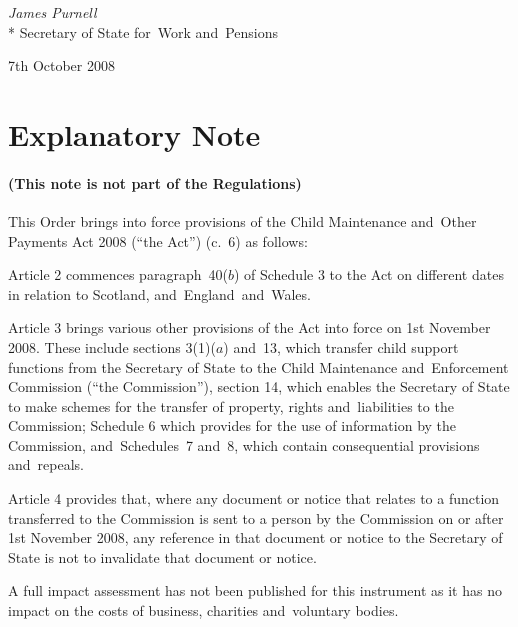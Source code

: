 \documentclass[12pt,a4paper]{article}
\begin{document}
{\raggedleft
\emph{James Purnell}\\*
Secretary
of State %
for~Work and~Pensions

}

7th October 2008

\small

\part{Explanatory Note}

\renewcommand\parthead{— Explanatory Note}

\subsection*{(This note is not part of the Regulations)}

This Order brings into force provisions of the Child Maintenance and~Other Payments Act 2008 (“the Act”) (c.~6) as follows:

Article 2 commences paragraph~40($b$)  of Schedule 3 to the Act on different dates in relation to Scotland, and~England~and~Wales.

Article 3 brings various other provisions of the Act into force on 1st November 2008. These include sections 3(1)($a$)  and~13, which transfer child support functions from the Secretary of State to the Child Maintenance and~Enforcement Commission (“the Commission”), section 14, which enables the Secretary of State to make schemes for the transfer of property, rights and~liabilities to the Commission; Schedule 6 which provides for the use of information by the Commission, and~Schedules~7 and~8, which contain consequential provisions and~repeals.

Article 4 provides that, where any document or notice that relates to a function transferred to the Commission is sent to a person by the Commission on or after 1st November 2008, any reference in that document or notice to the Secretary of State is not to invalidate that document or notice.

A full impact assessment has not been published for this instrument as it has no impact on the costs of business, charities and~voluntary bodies. 
\end{document}
